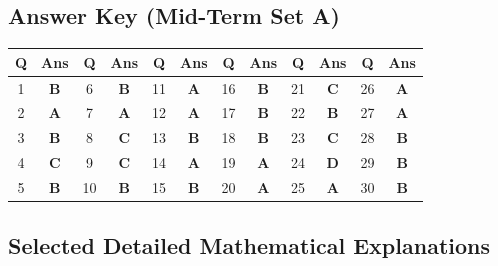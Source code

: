 \subsection*{Answer Key (Mid-Term Set A)}

\begin{center}
\begin{tabular}{|c|c||c|c||c|c||c|c||c|c||c|c|}
\hline
\textbf{Q} & \textbf{Ans} & \textbf{Q} & \textbf{Ans} & \textbf{Q} & \textbf{Ans} & \textbf{Q} & \textbf{Ans} & \textbf{Q} & \textbf{Ans} & \textbf{Q} & \textbf{Ans} \\
\hline
1 & \textbf{B} & 6 & \textbf{B} & 11 & \textbf{A} & 16 & \textbf{B} & 21 & \textbf{C} & 26 & \textbf{A} \\
2 & \textbf{A} & 7 & \textbf{A} & 12 & \textbf{A} & 17 & \textbf{B} & 22 & \textbf{B} & 27 & \textbf{A} \\
3 & \textbf{B} & 8 & \textbf{C} & 13 & \textbf{B} & 18 & \textbf{B} & 23 & \textbf{C} & 28 & \textbf{B} \\
4 & \textbf{C} & 9 & \textbf{C} & 14 & \textbf{A} & 19 & \textbf{A} & 24 & \textbf{D} & 29 & \textbf{B} \\
5 & \textbf{B} & 10 & \textbf{B} & 15 & \textbf{B} & 20 & \textbf{A} & 25 & \textbf{A} & 30 & \textbf{B} \\
\hline
\end{tabular}
\end{center}

\vspace{3mm}
\subsection*{Selected Detailed Mathematical Explanations}

